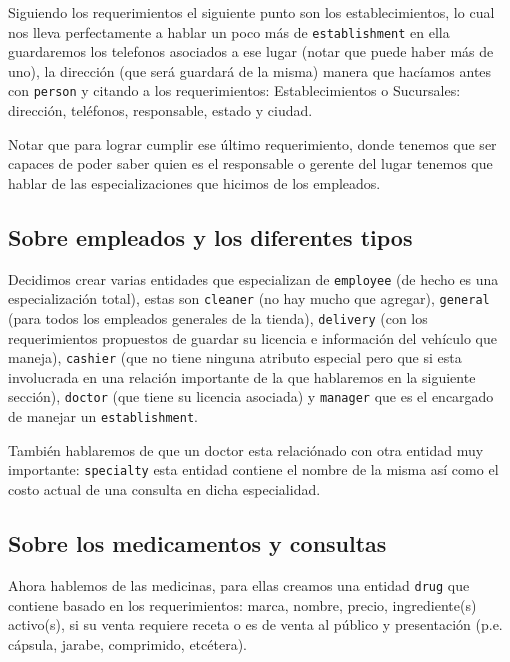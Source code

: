 \documentclass[12pt, fleqn]{report}                             %
\theoremstyle{break}                                            %
\begin{document}
          Siguiendo los requerimientos el siguiente punto son los establecimientos, 
          lo cual nos lleva perfectamente a hablar un poco más de 
          \texttt{establishment} en ella guardaremos los telefonos asociados a ese
          lugar (notar que puede haber más de uno), la dirección (que será guardará de la misma)
          manera que hacíamos antes con \texttt{person} y citando a los requerimientos:
          Establecimientos o Sucursales: dirección, teléfonos, responsable, estado y ciudad.

          Notar que para lograr cumplir ese último requerimiento, donde tenemos que ser
          capaces de poder saber quien es el responsable o gerente del lugar tenemos que 
          hablar de las especializaciones que hicimos de los empleados.

        \subsection{Sobre empleados y los diferentes tipos}

          Decidimos crear varias entidades que especializan de \texttt{employee} 
          (de hecho es una especialización total),
          estas son \texttt{cleaner} (no hay mucho que agregar), 
          \texttt{general} (para todos los empleados generales de la tienda), 
          \texttt{delivery} (con los requerimientos propuestos de guardar su licencia e
          información del vehículo que maneja), \texttt{cashier} (que no tiene ninguna atributo
          especial pero que si esta involucrada en una relación importante de la que hablaremos
          en la siguiente sección), \texttt{doctor} (que tiene su licencia asociada) y \texttt{manager}
          que es el encargado de manejar un \texttt{establishment}.

          También hablaremos de que un doctor esta relaciónado con otra entidad muy importante:
          \texttt{specialty} esta entidad contiene el nombre de la misma así como el costo actual de
          una consulta en dicha especialidad. 


        \subsection{Sobre los medicamentos y consultas}

          Ahora hablemos de las medicinas, para ellas creamos una entidad \texttt{drug} que contiene
          basado en los requerimientos: marca, nombre, precio, ingrediente(s) activo(s), si su venta requiere 
          receta o es de venta al público y presentación (p.e. cápsula, jarabe, comprimido, etcétera).
          
\end{document}
